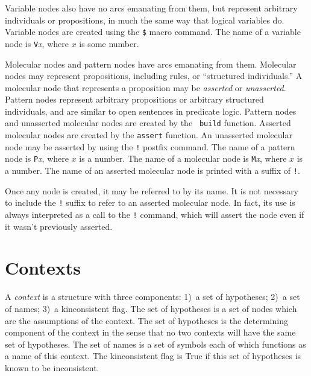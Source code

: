 \documentclass{book}
\makeatletter
\newcommand{\ct}[1]{{\ttfamily #1}} %
\newcommand{\indexct}[1]{\index{#1@\ct{#1}}} %
\makeatother
\begin{document}
Variable nodes also have no arcs emanating from
them, but represent arbitrary individuals or propositions, in much the
same way that logical variables do.  Variable nodes are created using
the {\tt \$}\indexct{\$} macro command.  The name of a variable node
is {\tt V}{\em x}, where $x$ is some number.

Molecular nodes and pattern
nodes have arcs emanating from them.  Molecular
nodes may represent propositions, including rules, or ``structured
individuals.''  A molecular node that represents a proposition may be
{\em asserted} or {\em
unasserted}.  Pattern nodes represent
arbitrary propositions or arbitrary structured individuals, and are
similar to open sentences in predicate logic.  Pattern nodes and
unasserted molecular nodes are created by the {\tt
build}\indexct{build} function.  Asserted molecular nodes are created
by the {\tt assert}\indexct{assert} function.  An unasserted molecular
node may be asserted by using the {\tt !}\index{"!@\ct{"!}} postfix
command.  The name of a pattern node is {\tt P}{\em x}, where $x$ is a
number.  The name of a molecular node is {\tt M}{\em x}, where $x$ is
a number.  The name of an asserted molecular node is printed with a
suffix of {\tt !}\index{"!@\ct{"!}}.

Once any node is created, it may be referred to by its name.  It is
not necessary to include the {\tt !}\index{"!@\ct{"!}} suffix to refer
to an asserted molecular node.  In fact, its use is always interpreted
as a call to the {\tt !}  command, which will assert the node even if
it wasn't previously asserted.

\section{Contexts}\label{contextchap}

A {\em context} is a structure with three components: 1)~a set
of hypotheses; 2)~a set of names; 3)~a kinconsistent flag.  The set of
hypotheses is a set of nodes which are the assumptions of the
context.  The set of hypotheses is the determining component of the context in
the sense that no two contexts will have the same set of hypotheses.  The set of
names is a set of symbols each of which functions as a
name of this context.  The kinconsistent flag is True if
this set of hypotheses is known to be inconsistent.
\end{document}

